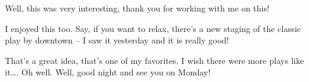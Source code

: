 \heroSTUDENT{} Well, this was very interesting, thank you for working with me
on this!

\heroADVISOR{} I enjoyed this too. Say, if you want to relax, there's a new
staging of the classic play by \citet{fischer2010play} downtown -- I saw
it yesterday and it is really good!

\heroSTUDENT{} That's a great idea, that's one of my favorites. I wish there
were more plays like it\ldots{}. Oh well. Well, good night and see you
on Monday!
